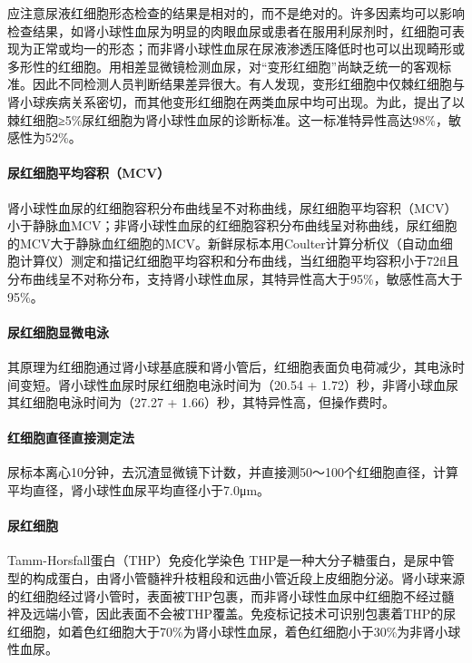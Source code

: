 应注意尿液红细胞形态检查的结果是相对的，而不是绝对的。许多因素均可以影响检查结果，如肾小球性血尿为明显的肉眼血尿或患者在服用利尿剂时，红细胞可表现为正常或均一的形态；而非肾小球性血尿在尿液渗透压降低时也可以出现畸形或多形性的红细胞。用相差显微镜检测血尿，对“变形红细胞”尚缺乏统一的客观标准。因此不同检测人员判断结果差异很大。有人发现，变形红细胞中仅棘红细胞与肾小球疾病关系密切，而其他变形红细胞在两类血尿中均可出现。为此，提出了以棘红细胞≥5\%尿红细胞为肾小球性血尿的诊断标准。这一标准特异性高达98\%，敏感性为52\%。

\paragraph{尿红细胞平均容积（MCV）}

肾小球性血尿的红细胞容积分布曲线呈不对称曲线，尿红细胞平均容积（MCV）小于静脉血MCV；非肾小球性血尿的红细胞容积分布曲线呈对称曲线，尿红细胞的MCV大于静脉血红细胞的MCV。新鲜尿标本用Coulter计算分析仪（自动血细胞计算仪）测定和描记红细胞平均容积和分布曲线，当红细胞平均容积小于72fl且分布曲线呈不对称分布，支持肾小球性血尿，其特异性高大于95\%，敏感性高大于95\%。

\paragraph{尿红细胞显微电泳}

其原理为红细胞通过肾小球基底膜和肾小管后，红细胞表面负电荷减少，其电泳时间变短。肾小球性血尿时尿红细胞电泳时间为（20.54
+ 1.72）秒，非肾小球血尿其红细胞电泳时间为（27.27 +
1.66）秒，其特异性高，但操作费时。

\paragraph{红细胞直径直接测定法}

尿标本离心10分钟，去沉渣显微镜下计数，并直接测50～100个红细胞直径，计算平均直径，肾小球性血尿平均直径小于7.0μm。

\paragraph{尿红细胞}

Tamm-Horsfall蛋白（THP）免疫化学染色
THP是一种大分子糖蛋白，是尿中管型的构成蛋白，由肾小管髓袢升枝粗段和远曲小管近段上皮细胞分泌。肾小球来源的红细胞经过肾小管时，表面被THP包裹，而非肾小球性血尿中红细胞不经过髓袢及远端小管，因此表面不会被THP覆盖。免疫标记技术可识别包裹着THP的尿红细胞，如着色红细胞大于70\%为肾小球性血尿，着色红细胞小于30\%为非肾小球性血尿。


